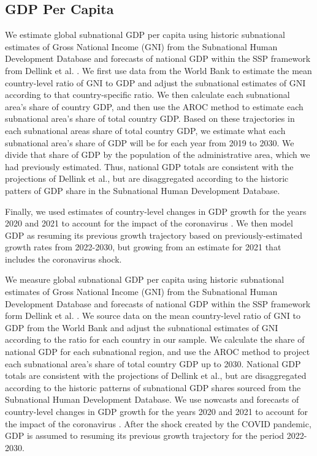 \documentclass{article}
\begin{document}
\pagebreak
\subsection{GDP Per Capita}
We estimate global subnational GDP per capita using historic subnational estimates of Gross National Income (GNI) from the Subnational Human Development Database \cite{Smits2019} and forecasts of national GDP within the SSP framework from Dellink et al. \cite{Dellink2017}.  We first use data from the World Bank to estimate the mean country-level ratio of GNI to GDP and adjust the subnational estimates of GNI according to that country-specific ratio.  We then calculate each subnational area's share of country GDP, and then use the AROC method to estimate each subnational area's share of total country GDP.  Based on these trajectories in each subnational areas share of total country GDP, we estimate what each subnational area's share of GDP will be for each year from 2019 to 2030.  We divide that share of GDP by the population of the administrative area, which we had previously estimated.  Thus, national GDP totals are consistent with the projections of Dellink et al., but are disaggregated according to the historic patters of GDP share in the Subnational Human Development Database.

Finally, we used estimates of country-level changes in GDP growth for the years 2020 and 2021 to account for the impact of the coronavirus \citep{prospects2020}.  We then model GDP as resuming its previous growth trajectory based on previously-estimated growth rates from 2022-2030, but growing from an estimate for 2021 that includes the coronavirus shock.

We measure global subnational GDP per capita using historic subnational estimates of Gross National Income (GNI) from the Subnational Human Development Database \citep{Smits2019} and forecasts of national GDP within the SSP framework form Dellink et al. \citep{Dellink2017}. We source data on the mean country-level ratio of GNI to GDP from the World Bank and adjust the subnational estimates of GNI according to the ratio for each country in our sample. We calculate the share of national GDP for each subnational region, and use the AROC method to project each subnational area’s share of total country GDP up to 2030. National GDP totals are consistent with the projections of Dellink et al., but are disaggregated according to the historic patterns of subnational GDP shares sourced from the Subnational Human Development Database. We use nowcasts and forecasts of country-level changes in GDP growth for the years 2020 and 2021 to account for the impact of the coronavirus \citep{prospects2020}. After the shock created by the COVID pandemic, GDP is assumed to resuming its previous growth trajectory for the period 2022-2030.
\end{document}
